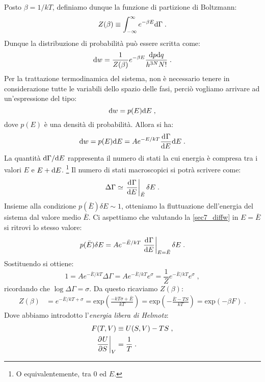 Posto $\beta=1/kT$, definiamo dunque la funzione di partizione di Boltzmann:
\begin{equation}
Z(\beta)\equiv\int_{-\infty}^{\infty} e^{-\beta E}\diff{\Gamma}\;.
\end{equation}
Dunque la distribuzione di probabilità può essere scritta come:
\begin{equation}
\diff[w]=\frac{1}{Z(\beta)}e^{-\beta E}\frac{\diff[p]\diff[q]}{h^{3N}N!}\;.
\end{equation}
Per la trattazione termodinamica del sistema, non è necessario tenere in considerazione tutte le variabili dello spazio delle fasi, perciò vogliamo arrivare ad un'espressione del tipo:
\begin{equation}
\diff[w]=p(E)\diff[E]\;,
\end{equation}
dove $p(E)$ è una densità di probabilità. Allora si ha:
\begin{equation}
\diff[w]=p(E)\diff[E]=Ae^{-E/kT}\dev{\Gamma}{E}\diff[E]\;. \label{sec7_diffw}
\end{equation}
La quantità $\diff[\Gamma]/\diff[E]$ rappresenta il numero di stati la cui energia è compresa tra i valori $E$ e $E+\diff[E]$. \footnote{O equivalentemente, tra 0 ed $E$.} Il numero di stati macroscopici si potrà scrivere come:
\begin{equation}
\Delta\Gamma\simeq \left.\dev{\Gamma}{E}\right|_{\bar{E}}\delta E\;.
\end{equation}
Insieme alla condizione $p(\bar{E})\delta E\sim 1$, otteniamo la fluttuazione dell'energia del sistema dal valore medio $\bar{E}$.
Ci aspettiamo che valutando la \eqref{sec7_diffw} in $E=\bar{E}$ si ritrovi lo stesso valore:
\begin{equation}
p(\bar{E})\delta E=Ae^{-\bar{E}/kT}\left.\dev{\Gamma}{E}\right|_{E=\bar{E}}\delta E\;.
\end{equation}
Sostituendo si ottiene:
\begin{equation}
1=Ae^{-\bar{E}/kT}\Delta\Gamma=Ae^{-\bar{E}/kT}e^{\sigma}=\frac{1}{Z}e^{-\bar{E}/kT} e^{\sigma}\;,
\end{equation}
ricordando che $\log\Delta\Gamma=\sigma$. Da questo ricaviamo $Z(\beta)$:
\begin{align}
Z(\beta)&=e^{-\bar{E}/kT+\sigma}= \mathrm{exp}\left(\frac{-kT\sigma+\bar{E}}{kT}\right)= \mathrm{exp}\left(-\frac{\bar{E}-TS}{kT}\right) =  \mathrm{exp}(-\beta F)\;.
\end{align}
Dove abbiamo introdotto l'\textit{energia libera di Helmotz}:
\begin{align}
F(T,V) &\equiv U(S,V)-TS\;, \\
\left.\pdev{U}{S}\right|_V&=\frac{1}{T}\;.
\end{align}

